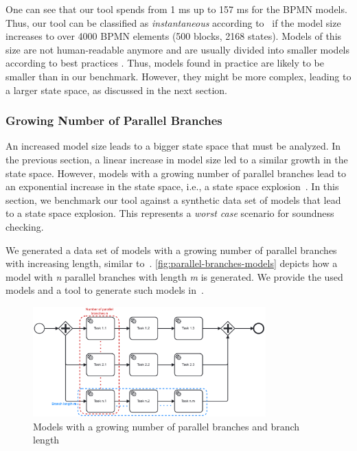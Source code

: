 \documentclass[runningheads]{llncs}
\begin{document}
One can see that our tool spends from 1 ms up to 157 ms for the BPMN models.
Thus, our tool can be classified as \textit{instantaneous} according to~\cite{fahlandAnalysisDemandInstantaneous2011} if the model size increases to over 4000 BPMN elements (500 blocks, 2168 states).
Models of this size are not human-readable anymore and are usually divided into smaller models according to best practices \cite{fahlandAnalysisDemandInstantaneous2011}.
Thus, models found in practice are likely to be smaller than in our benchmark.
However, they might be more complex, leading to a larger state space, as discussed in the next section.

\subsubsection{Growing Number of Parallel Branches}
An increased model size leads to a bigger state space that must be analyzed.
In the previous section, a linear increase in model size led to a similar growth in the state space.
However, models with a growing number of parallel branches lead to an exponential increase in the state space, i.e., a state space explosion~\cite{valmariStateExplosionProblem1998}.
In this section, we benchmark our tool against a synthetic data set of models that lead to a state space explosion.
This represents a \textit{worst case} scenario for soundness checking.

We generated a data set of models with a growing number of parallel branches with increasing length, similar to~\cite{corradiniFormalApproachAnalysis2021}.
\autoref{fig:parallel-branches-models} depicts how a model with \textit{n} parallel branches with length \textit{m} is generated.
We provide the used models and a tool to generate such models in~\cite{noauthorgivenBPM2024Artifacts2024}.

\begin{figure}[ht]
	\centering
	\includegraphics[width=0.8\textwidth]{images/parallel-branches}
	\caption{Models with a growing number of parallel branches and branch length}
	\label{fig:parallel-branches-models}
\end{figure}
\end{document}
